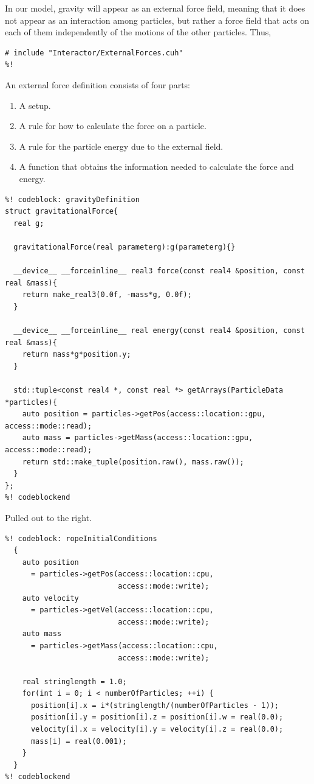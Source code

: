 In our model, gravity will appear as an external force field, meaning that it 
does not appear as an interaction among particles, but rather a force field that
acts on each of them independently of the motions of the other particles. Thus,
\begin{lstlisting}
# include "Interactor/ExternalForces.cuh"
%!
\end{lstlisting}

An external force definition consists of four parts:
\begin{enumerate}
  \item A setup.
  \item A rule for how to calculate the force on a particle.
  \item A rule for the particle energy due to the external field.
  \item A function that obtains the information needed to calculate the force 
        and energy.
\end{enumerate}

\begin{lstlisting}
%! codeblock: gravityDefinition
struct gravitationalForce{
  real g;

  gravitationalForce(real parameterg):g(parameterg){}

  __device__ __forceinline__ real3 force(const real4 &position, const real &mass){
    return make_real3(0.0f, -mass*g, 0.0f);
  }

  __device__ __forceinline__ real energy(const real4 &position, const real &mass){
    return mass*g*position.y;
  }

  std::tuple<const real4 *, const real *> getArrays(ParticleData *particles){
    auto position = particles->getPos(access::location::gpu, access::mode::read);
    auto mass = particles->getMass(access::location::gpu, access::mode::read);
    return std::make_tuple(position.raw(), mass.raw());
  }
};
%! codeblockend
\end{lstlisting}

Pulled out to the right.

\begin{lstlisting}
%! codeblock: ropeInitialConditions
  {
    auto position
      = particles->getPos(access::location::cpu,
                          access::mode::write);
    auto velocity
      = particles->getVel(access::location::cpu,
                          access::mode::write);
    auto mass
      = particles->getMass(access::location::cpu,
                          access::mode::write);

    real stringlength = 1.0;
    for(int i = 0; i < numberOfParticles; ++i) {
      position[i].x = i*(stringlength/(numberOfParticles - 1));
      position[i].y = position[i].z = position[i].w = real(0.0);
      velocity[i].x = velocity[i].y = velocity[i].z = real(0.0);
      mass[i] = real(0.001);
    }
  }
%! codeblockend
\end{lstlisting}

